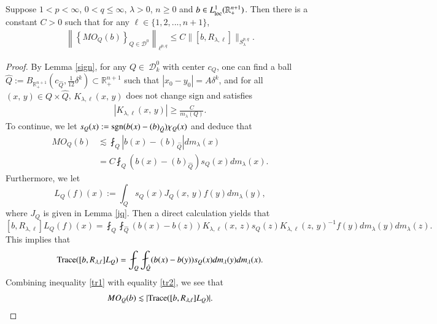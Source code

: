 \documentclass[12pt]{amsart}
\begin{document}
\begin{proposition}\label{weakpro}
Suppose {\color{red}$1<p<\infty$}, $0<q\leq \infty$, $\lambda>0$, $n\geq 0$ and $b\in L^1_{\rm loc}(\mathbb{R}^{n+1}_+)$. Then there is a constant $C>0$ such that for any $\ell\in\{1,2,...,n+1\}$,
\begin{align*}
\left\|\left\{MO_Q(b)\right\}_{Q\in\mathcal{D}^0}\right\|_{\ell^{p,q}}\leq C\|[b,R_{\lambda,\ell}]\|_{S_\lambda^{p,q}}.
\end{align*}

\end{proposition}
\begin{proof}
By Lemma \ref{sign}, for any $Q\in \ \mathcal{D}^0_{k}$ with center $c_Q$, one can find a ball $\hat{Q}:=B_{\mathbb{R}_{+}^{n+1}}(c_{\hat{Q}},\frac{1}{12}\delta^k)\subset \mathbb{R}_{+}^{n+1}$ such that $|x_{0}-y_{0}|=A\delta^k$, and for all $(x,\,y)\in Q\times\hat{Q}$, $K_{\lambda,\ell}(x,\,y)$ does not change sign and satisfies
\begin{align*}
|K_{\lambda,\ell}(x,\,y)|\geq \frac{C}{m_\lambda(Q)}.
\end{align*}
To continue, we let $s_Q(x):={\rm sgn}(b(x)-(b)_{\hat{Q}})\chi_Q(x)$ and deduce that
\begin{align}\label{tr1}
MO_Q(b)%
&\lesssim \fint_Q|b(x)-(b)_{\hat{Q}}|dm_\lambda(x)\nonumber\\
&=C\fint_Q(b(x)-(b)_{\hat{Q}})s_Q(x)dm_\lambda(x).
\end{align}
Furthermore, we let $$L_{Q}(f)(x):=\int_Qs_Q(x)J_{Q}(x,\,y)f(y)dm_\lambda(y),$$ where $J_{Q}$ is given in Lemma \ref{jq}. Then a direct calculation yields that
$$[b,R_{\lambda,\ell}]L_{Q}(f)(x)=\fint_Q\fint_{\hat{Q}}(b(x)-b(z))K_{\lambda,\ell}(x,\,z)s_Q(z)K_{\lambda,\ell}(z,\,y)^{-1}f(y)dm_\lambda(y)dm_\lambda(z).$$
This implies that
\begin{align}\label{tr2}
{\rm Trace}([b,R_{\lambda,\ell}]L_{Q})=\fint_Q\fint_{\hat{Q}}(b(x)-b(y))s_Q(x)dm_\lambda(y)dm_\lambda(x).
\end{align}
Combining inequality \eqref{tr1} with equality \eqref{tr2}, we see that
\begin{align*}
MO_Q(b)\lesssim |{\rm Trace}([b,R_{\lambda,\ell}]L_{Q})|.

\end{align*}
\end{proof}
\end{document}
